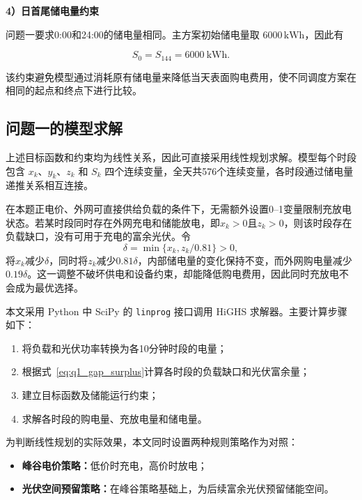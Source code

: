 \textbf{4）日首尾储电量约束}

问题一要求0:00和24:00的储电量相同。主方案初始储电量取 \(6000\,\mathrm{kWh}\)，因此有

\begin{equation}
S_0=S_{144}=6000\ \mathrm{kWh}.
\label{eq:q1_terminal_constraint}
\end{equation}

该约束避免模型通过消耗原有储电量来降低当天表面购电费用，使不同调度方案在相同的起点和终点下进行比较。

\subsection{问题一的模型求解}

上述目标函数和约束均为线性关系，因此可直接采用线性规划求解。模型每个时段包含 \(x_k\)、\(y_k\)、\(z_k\) 和 \(S_k\) 四个连续变量，全天共576个连续变量，各时段通过储电量递推关系相互连接。

在本题正电价、外网可直接供给负载的条件下，无需额外设置0--1变量限制充放电状态。若某时段同时存在外网充电和储能放电，即$x_k>0$且$z_k>0$，则该时段存在负载缺口，没有可用于充电的富余光伏。令
\[
\delta=\min\{x_k,z_k/0.81\}>0,
\]
将$x_k$减少$\delta$，同时将$z_k$减少$0.81\delta$，内部储电量的变化保持不变，而外网购电量减少$0.19\delta$。这一调整不破坏供电和设备约束，却能降低购电费用，因此同时充放电不会成为最优选择。

本文采用 Python 中 SciPy 的 \texttt{linprog} 接口调用 HiGHS 求解器。主要计算步骤如下：

\begin{enumerate}
    \item 将负载和光伏功率转换为各10分钟时段的电量；
    \item 根据式~\eqref{eq:q1_gap_surplus}计算各时段的负载缺口和光伏富余量；
    \item 建立目标函数及储能运行约束；
    \item 求解各时段的购电量、充放电量和储电量。
\end{enumerate}

为判断线性规划的实际效果，本文同时设置两种规则策略作为对照：

\begin{itemize}
    \item \textbf{峰谷电价策略：}低价时充电，高价时放电；
    \item \textbf{光伏空间预留策略：}在峰谷策略基础上，为后续富余光伏预留储能空间。
\end{itemize}


